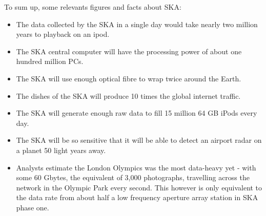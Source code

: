 To sum up, some relevants figures and facts about SKA:

\begin{itemize}

\item The data collected by the SKA in a single day would take nearly two million years to playback on an ipod.
\item The SKA central computer will have the processing power of about one hundred million PCs.
\item The SKA will use enough optical fibre to wrap twice around the Earth.
\item The dishes of the SKA will produce 10 times the global internet traffic.
\item The SKA will generate enough raw data to fill 15 million 64 GB iPods every day.
\item The SKA will be so sensitive that it will be able to detect an airport radar on a planet 50 light years away.
\item Analysts estimate the London Olympics was the most data-heavy yet - with some 60 Gbytes, the equivalent of 3,000 photographs, travelling across the network in the Olympic Park every second. This however is only equivalent to the data rate from about half a low frequency aperture array station in SKA phase one.

\end{itemize}